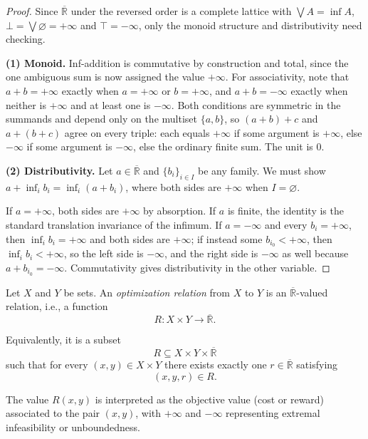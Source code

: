 \begin{proof}
	Since $\overline{\mathbb{R}}$ under the reversed order is a complete lattice
	with $\bigvee A = \inf A$, $\bot = \bigvee \varnothing = +\infty$ and
	$\top = -\infty$, only the monoid structure and distributivity need checking.

	\medskip
	\noindent
	\textbf{(1) Monoid.}
	Inf-addition is commutative by construction and total, since the one
	ambiguous sum is now assigned the value $+\infty$. For associativity, note
	that $a + b = +\infty$ exactly when $a = +\infty$ or $b = +\infty$, and
	$a + b = -\infty$ exactly when neither is $+\infty$ and at least one is
	$-\infty$. Both conditions are symmetric in the summands and depend only on
	the multiset $\{a,b\}$, so $(a+b)+c$ and $a+(b+c)$ agree on every triple:
	each equals $+\infty$ if some argument is $+\infty$, else $-\infty$ if some
	argument is $-\infty$, else the ordinary finite sum. The unit is $0$.

	\medskip
	\noindent
	\textbf{(2) Distributivity.}
	Let $a \in \overline{\mathbb{R}}$ and $\{b_i\}_{i \in I}$ be any family. We
	must show $a + \inf_i b_i = \inf_i (a + b_i)$, where both sides are $+\infty$
	when $I = \varnothing$.

	If $a = +\infty$, both sides are $+\infty$ by absorption. If $a$ is finite,
	the identity is the standard translation invariance of the infimum. If
	$a = -\infty$ and every $b_i = +\infty$, then $\inf_i b_i = +\infty$ and both
	sides are $+\infty$; if instead some $b_{i_0} < +\infty$, then
	$\inf_i b_i < +\infty$, so the left side is $-\infty$, and the right side is
	$-\infty$ as well because $a + b_{i_0} = -\infty$.
	Commutativity gives distributivity in the other variable.
\end{proof}


\begin{definition}
	Let $X$ and $Y$ be sets.
	An \emph{optimization relation} from $X$ to $Y$ is an
	$\overline{\mathbb{R}}$-valued relation, i.e., a function
	\[
		R : X \times Y \to \overline{\mathbb{R}}.
	\]

	Equivalently, it is a subset
	\[
		R \subseteq X \times Y \times \overline{\mathbb{R}}
	\]
	such that for every $(x,y) \in X \times Y$ there exists exactly one
	$r \in \overline{\mathbb{R}}$ satisfying
	\[
		(x,y,r) \in R.
	\]

	The value $R(x,y)$ is interpreted as the objective value
	(cost or reward) associated to the pair $(x,y)$,
	with $+\infty$ and $-\infty$ representing extremal infeasibility
	or unboundedness.
\end{definition}

